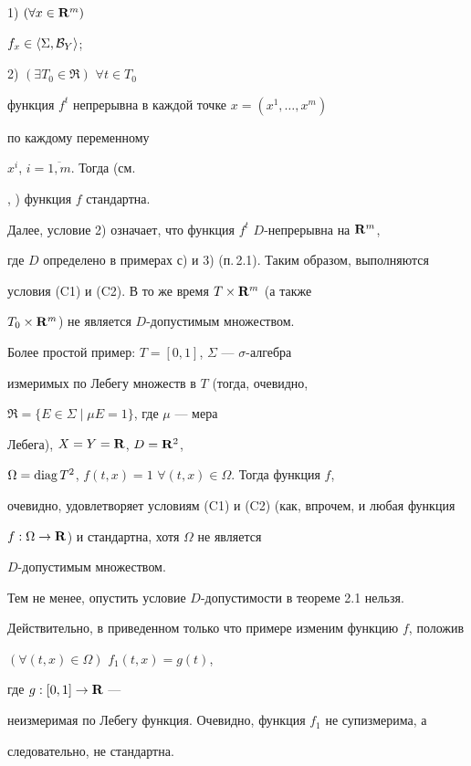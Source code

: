 

1) $(\forall x\in\bold{R}^m)$ \; 


$f_x\in\langle \Sigma,{\cal B}_Y\rangle$;


2) $(\exists T_0\in\Re)$ \; $\forall t\in T_0$


функция $f^t$ непрерывна в каждой точке $x=(x^1,\dotsc,x^m)$


по каждому переменному


$x^i$, $i=\overline{1,m}$. Тогда (см.


\cite{Sh1}, \cite{Sh2}) функция $f$ стандартна.


Далее, условие 2) означает, что функция $f^t$ \; $D$-непрерывна на $\bold{R}^m$,


где $D$ определено в примерах с) и 3) (п.\,2.1). Таким образом, выполняются


условия (C1) и (C2). В то же время $T\times\bold{R}^m$ (а также


$T_0\times\bold{R}^m$) не является $D$-допустимым множеством.





Более простой пример: $T=[0,1]$, $\Sigma$ --- $\sigma$-алгебра


измеримых по Лебегу множеств в $T$ (тогда, очевидно,


$\Re=\{E\in\Sigma\mid \mu E=1\}$, где $\mu$ --- мера


Лебега), $X=Y=\bold{R}$, $D=\bold{R}^2$,


$\Omega=\operatorname{diag} T^2$, $f(t,x)=1$ $\forall (t,x)\in\Omega$. Тогда функция $f$,


очевидно, удовлетворяет условиям (C1) и (C2) (как, впрочем, и любая функция


$f:\Omega\to\bold{R}$) и стандартна, хотя $\Omega$ не является


$D$-допустимым множеством.





Тем не менее, опустить условие $D$-допустимости в теореме 2.1 нельзя.


Действительно, в приведенном только что примере изменим функцию $f$, положив


$(\forall (t,x)\in\Omega)$ \; $f_1(t,x)=g(t)$,


где $g:[0,1]\to\bold{R}$ ---


неизмеримая по Лебегу функция. Очевидно, функция $f_1$ не супизмерима, а


следовательно, не стандартна.





